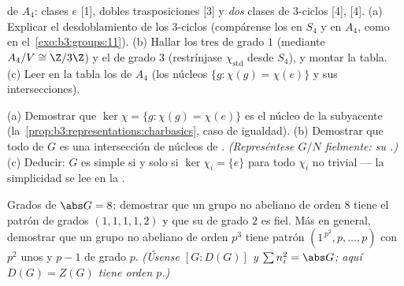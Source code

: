 \begin{exercise}[$\star\star$]\label{exo:b3:representations:5}
 de $A_4$:
clases $e$ [1], dobles trasposiciones [3] y \emph{dos} clases de
$3$-ciclos [4], [4]. (a) Explicar el desdoblamiento de los $3$-ciclos
(compárense los  en $S_4$
y en $A_4$, como en el~\cref{exo:b3:groups:11}). (b) Hallar los tres
 de grado $1$
(mediante $A_4/V \cong
\Z/3\Z$) y el  de
grado $3$ (restrínjase $\chi_{\mathrm{std}}$ desde $S_4$), y montar la
tabla. (c) Leer en la tabla los  de $A_4$ (los núcleos $\{g : \chi(g) = \chi(e)\}$ y sus
intersecciones).
\end{exercise}

\begin{exercise}[$\star\star$]\label{exo:b3:representations:6}
(a) Demostrar que $\ker\chi = \{g : \chi(g) = \chi(e)\}$ es el núcleo de
la  subyacente
(la~\cref{prop:b3:representations:charbasics}, caso de igualdad). (b)
Demostrar que todo  de $G$
es una intersección de núcleos de
. \emph{(Represéntese
$G/N$ fielmente: su
.)} (c)
Deducir: $G$ es simple si y solo si $\ker\chi_i = \{e\}$ para todo
$\chi_i$  no trivial ---
la simplicidad se lee en la .
\end{exercise}

\begin{exercise}[$\star\star$]\label{exo:b3:representations:7}
Grados de $\abs G = 8$: demostrar que un grupo no abeliano de orden $8$
tiene el patrón de grados $(1,1,1,1,2)$ y que su
 de grado $2$ es
fiel. Más en general, demostrar que un grupo no abeliano de orden $p^3$
tiene patrón $(1^{\,p^2},
p, \dots, p)$ con $p^2$ unos y $p - 1$
 de grado $p$.
\emph{(Úsense $[G : D(G)]$ y $\sum n_i^2 = \abs G$; aquí $D(G) = Z(G)$
tiene orden $p$.)}
\end{exercise}

